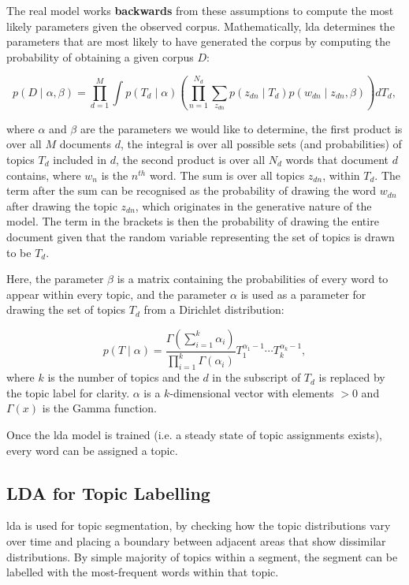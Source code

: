     The real model works \textbf{backwards} from these assumptions to compute the most likely parameters given the observed corpus.
    Mathematically, \gls{lda} determines the parameters that are most likely to have generated the corpus by computing the probability of obtaining a given corpus $D$:
    
    \begin{equation}
        p(D \mid \alpha, \beta)=\prod_{d=1}^{M} \int p\left(T_{d} \mid \alpha\right)\left(\prod_{n=1}^{N_{d}} \sum_{z_{d n}} p\left(z_{d n} \mid T_{d}\right) p\left(w_{d n} \mid z_{d n}, \beta\right)\right) d T_{d},
    \end{equation}
    
    where $\alpha$ and $\beta$ are the parameters we would like to determine,
    the first product is over all $M$ documents $d$,
    the integral is over all possible sets (and probabilities) of topics $T_d$ included in $d$, 
    the second product is over all $N_d$ words that document $d$ contains, where $w_n$ is the $n^{th}$ word.
    The sum is over all topics $z_{dn}$, within $T_d$.
    The term after the sum can be recognised as the probability of drawing the word $w_{dn}$ after drawing the topic $z_{dn}$, which originates in the generative nature of the model.
    The term in the brackets is then the probability of drawing the entire document given that the random variable representing the set of topics is drawn to be $T_d$.
    
    Here, the parameter $\beta$ is a matrix containing the probabilities of every word to appear within every topic, and the parameter $\alpha$ is used as a parameter for drawing the set of topics $T_d$ from a Dirichlet distribution:
    
    \begin{equation}
        p(T \mid \alpha)=\frac{\Gamma\left(\sum_{i=1}^{k} \alpha_{i}\right)}{\prod_{i=1}^{k} \Gamma\left(\alpha_{i}\right)} T_{1}^{\alpha_{1}-1} \cdots T_{k}^{\alpha_{k}-1},
    \end{equation}
    where $k$ is the number of topics and the $d$ in the subscript of $T_d$ is replaced by the topic label for clarity. $\alpha$ is a $k$-dimensional vector with elements $> 0$ and $\Gamma(x)$ is the Gamma function.
    
    Once the \gls{lda} model is trained (i.e. a steady state of topic assignments exists), every word can be assigned a topic.
    
    
    \subsection{LDA for Topic Labelling \label{ssec: lda for segmentation}}
    \gls{lda} is used for topic segmentation\cite{eisenstein2008bayesian, purver2006unsupervised, nguyen2012sits}, by checking how the topic distributions vary over time and placing a boundary between adjacent areas that show dissimilar distributions.
    By simple majority of topics within a segment, the segment can be labelled with the most-frequent words within that topic.
    
